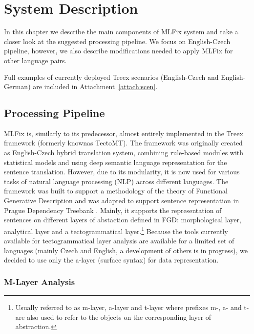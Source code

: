 \chapter{System Description}
\label{chap:system_descr}

In this chapter we describe the main components
of MLFix system and take a closer look at the suggested processing pipeline.
We focus on English-Czech pipeline, however, we also describe modifications
needed to apply MLFix for other language pairs.

Full examples of currently deployed Treex scenarios (English-Czech and English-German)
are included in Attachment~\ref{attach:scen}.


\section{Processing Pipeline}

MLFix is, similarly to its predecessor, almost entirely implemented in the
Treex \citep{Popel:2010:TMN:1884371.1884406}
framework (formerly knownas TectoMT).
The framework was originally created as English-Czech hybrid translation system, combining
rule-based modules with statistical models and using deep semantic language representation
for the sentence translation. However, due to its modularity, it is
now used for various tasks of natural language processing (NLP) across different
languages. The framework was built to support a methodology of the theory of Functional Generative Description \citep{Sgall1967}
and was adapted to support sentence representation in Prague Dependency Treebank \citep{pdt20:2006}.
Mainly, it supports the representation of sentences on different layers of abstaction defined in FGD: morphological layer,
analytical layer and a tectogrammatical layer.\footnote{Usually referred to as m-layer, a-layer and t-layer where prefixes m-, a- and t- are also used to refer to the objects on the corresponding layer of abstraction.}
Because the tools currently available for tectogrammatical layer analysis are available for
a limited set of languages (mainly Czech and English, a development of others is in progress),
we decided to use only the a-layer (surface syntax) for data representation.

\subsection{M-Layer Analysis}

